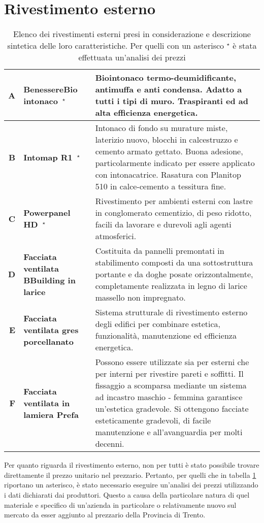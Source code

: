 \section{Rivestimento esterno}
\begin{table}[htbp]
\caption{Elenco dei rivestimenti esterni presi in considerazione e descrizione sintetica delle loro caratteristiche. Per quelli con un asterisco $^\star$ è stata effettuata un'analisi dei prezzi}
\label{MaterialiRIV}
\centering
\begin{tabularx}{\textwidth}{rXX}
    \toprule
        \textbf{A} & \textbf{BenessereBio intonaco $\,^\star$} & Biointonaco termo-deumidificante, antimuffa e anti condensa. 
        Adatto a tutti i tipi di muro. Traspiranti ed ad alta efficienza energetica. \\\midrule
        \textbf{B} & \textbf{Intomap R1 $\,^\star$} & Intonaco di fondo su murature miste, laterizio nuovo, blocchi in calcestruzzo e cemento armato gettato.  Buona adesione, particolarmente indicato per essere applicato con intonacatrice. 
        Rasatura con Planitop 510 in calce-cemento a tessitura fine.\\\midrule
        \textbf{C} & \textbf{Powerpanel HD $\,^\star$} & Rivestimento per ambienti esterni con lastre in conglomerato cementizio, di peso ridotto, facili da lavorare e durevoli agli agenti atmosferici.\\\midrule
        \textbf{D} & \textbf{Facciata ventilata BBuilding in larice} & Costituita da pannelli premontati in stabilimento composti da una sottostruttura portante e da doghe posate orizzontalmente, completamente realizzata in legno di larice massello non impregnato.\\\midrule
        \textbf{E} & \textbf{Facciata ventilata gres porcellanato} & Sistema strutturale di rivestimento esterno degli edifici per combinare estetica, funzionalità, manutenzione ed efficienza energetica. \\\midrule
        \textbf{F} & \textbf{Facciata ventilata in lamiera Prefa} & Possono essere utilizzate sia per esterni che per interni per rivestire pareti e soffitti. Il fissaggio a scomparsa mediante un sistema ad incastro maschio - femmina garantisce un'estetica gradevole. Si ottengono facciate esteticamente gradevoli, di facile manutenzione e all'avanguardia per molti decenni.\\
    \bottomrule
\end{tabularx}
\end{table}

Per quanto riguarda il rivestimento esterno, non per tutti è stato possibile trovare direttamente il prezzo unitario nel prezzario. 
Pertanto, per quelli che in tabella \ref{MaterialiRIV} riportano un asterisco, è stato necessario eseguire un'analisi dei prezzi utilizzando i dati dichiarati dai produttori. 
Questo a causa della particolare natura di quel materiale e specifico di un'azienda in particolare o relativamente nuovo sul mercato da esser aggiunto al prezzario della Provincia di Trento.

